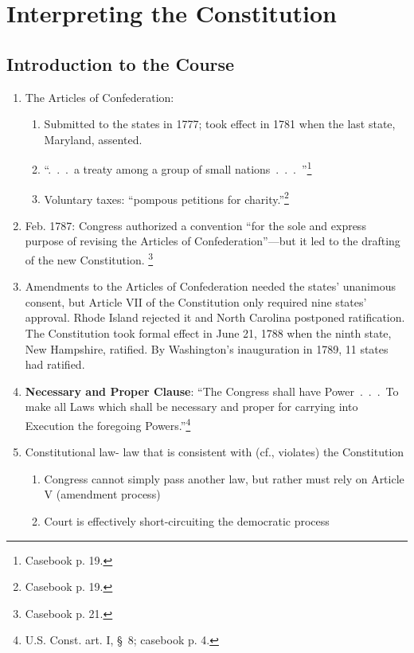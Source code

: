 \section{Interpreting the Constitution}

\subsection{Introduction to the Course}

\begin{enumerate}
    \item The Articles of Confederation:
    \begin{enumerate}
        \item Submitted to the states in 1777; took effect in 1781 when the 
        last state, Maryland, assented.
        \item ``.~.~.~a treaty among a group of small 
        nations~.~.~.~''\footnote{Casebook p.  19.}
        \item Voluntary taxes: ``pompous petitions for 
        charity.''\footnote{Casebook p. 19.}
    \end{enumerate}
    \item Feb. 1787: Congress authorized a convention ``for the sole and 
    express purpose of revising the Articles of 
    Confederation''---but it led to the drafting of the new Constitution. 
    \footnote{Casebook p. 21.}
    \item Amendments to the Articles of Confederation needed the states' 
    unanimous consent, but Article VII of the Constitution only required nine 
    states' approval. Rhode Island rejected it and North Carolina postponed 
    ratification. The Constitution took formal effect in June 21, 1788 when 
    the ninth state, New Hampshire, ratified. By Washington's inauguration in 
    1789, 11 states had ratified.
    \item \textbf{Necessary and Proper Clause}: ``The Congress shall have 
    Power~.~.~.~To make all Laws which shall be necessary and proper for carrying 
    into Execution the foregoing Powers.''\footnote{U.S. Const. art. I, \S\ 8; 
    casebook p. 4.}
    \item Constitutional law- law that is consistent with (cf., violates) the Constitution
    \begin{enumerate}
    \item Congress cannot simply pass another law, but rather must rely on Article V (amendment process)
    \item Court is effectively short-circuiting the democratic process

\end{enumerate}
\end{enumerate}
